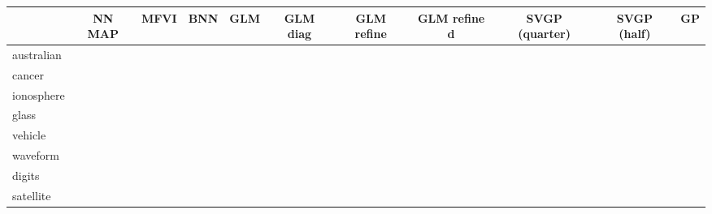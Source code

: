 \begin{tabular}{l C{0.5\tblw} C{0.5\tblw} C{0.5\tblw} C{0.5\tblw} C{0.5\tblw} C{0.5\tblw} C{0.5\tblw} C{0.5\tblw} C{0.5\tblw} C{0.5\tblw}}
\toprule
& NN MAP & MFVI & BNN & GLM & GLM diag & GLM refine & GLM refine d & SVGP (quarter) & SVGP (half) & GP  \\
\midrule
\sc australian &  &  &  &  &  &  &  &  &  &  \\
\sc cancer &  &  &  &  &  &  &  &  &  &  \\
\sc ionosphere &  &  &  &  &  &  &  &  &  &  \\
\sc glass &  &  &  &  &  &  &  &  &  &  \\
\sc vehicle &  &  &  &  &  &  &  &  &  &  \\
\sc waveform &  &  &  &  &  &  &  &  &  &  \\
\sc digits &  &  &  &  &  &  &  &  &  &  \\
\sc satellite &  &  &  &  &  &  &  &  &  &  \\
\bottomrule
\end{tabular}
